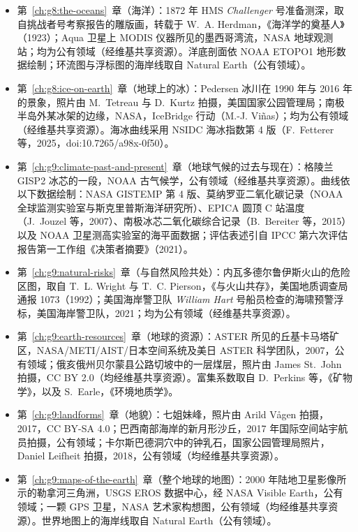 \begin{itemize}
  \item 第~\ref{ch:g8:the-oceans}~章（海洋）：1872 年 HMS \emph{Challenger} 号准备测深，取自挑战者号考察报告的雕版画，转载于 W.~A. Herdman，《海洋学的奠基人》（1923）；Aqua 卫星上 MODIS 仪器所见的墨西哥湾流，NASA 地球观测站；均为公有领域（经维基共享资源）。洋底剖面依 NOAA ETOPO1 地形数据绘制；环流图与浮标图的海岸线取自 Natural Earth（公有领域）。
  \item 第~\ref{ch:g8:ice-on-earth}~章（地球上的冰）：Pedersen 冰川在 1990 年与 2016 年的景象，照片由 M.~Tetreau 与 D.~Kurtz 拍摄，美国国家公园管理局；南极半岛外某冰架的边缘，NASA，IceBridge 行动（M.-J. Viñas）；均为公有领域（经维基共享资源）。海冰曲线采用 NSIDC 海冰指数第 4 版（F.~Fetterer 等，2025，doi:10.7265/a98x-0f50）。
  \item 第~\ref{ch:g9:climate-past-and-present}~章（地球气候的过去与现在）：格陵兰 GISP2 冰芯的一段，NOAA 古气候学，公有领域（经维基共享资源）。曲线依以下数据绘制：NASA GISTEMP 第 4 版、莫纳罗亚二氧化碳记录（NOAA 全球监测实验室与斯克里普斯海洋研究所）、EPICA 圆顶 C 站温度（J.~Jouzel 等，2007）、南极冰芯二氧化碳综合记录（B.~Bereiter 等，2015）以及 NOAA 卫星测高实验室的海平面数据；评估表述引自 IPCC 第六次评估报告第一工作组《决策者摘要》（2021）。
  \item 第~\ref{ch:g9:natural-risks}~章（与自然风险共处）：内瓦多德尔鲁伊斯火山的危险区图，取自 T.~L. Wright 与 T.~C. Pierson，《与火山共存》，美国地质调查局通报 1073（1992）；美国海岸警卫队 \emph{William Hart} 号船员检查的海啸预警浮标，美国海岸警卫队，2021；均为公有领域（经维基共享资源）。
  \item 第~\ref{ch:g9:earth-resources}~章（地球的资源）：ASTER 所见的丘基卡马塔矿区，NASA/METI/AIST/日本空间系统及美日 ASTER 科学团队，2007，公有领域；俄亥俄州贝尔蒙县公路切坡中的一层煤层，照片由 James St.~John 拍摄，CC BY 2.0（均经维基共享资源）。富集系数取自 D.~Perkins 等，《矿物学》，以及 S.~Earle，《环境地质学》。
  \item 第~\ref{ch:g9:landforms}~章（地貌）：七姐妹峰，照片由 Arild Vågen 拍摄，2017，CC BY-SA 4.0；巴西南部海岸的新月形沙丘，2017 年国际空间站宇航员拍摄，公有领域；卡尔斯巴德洞穴中的钟乳石，国家公园管理局照片，Daniel Leifheit 拍摄，2018，公有领域（均经维基共享资源）。
  \item 第~\ref{ch:g9:maps-of-the-earth}~章（整个地球的地图）：2000 年陆地卫星影像所示的勒拿河三角洲，USGS EROS 数据中心，经 NASA Visible Earth，公有领域；一颗 GPS 卫星，NASA 艺术家构想图，公有领域（均经维基共享资源）。世界地图上的海岸线取自 Natural Earth（公有领域）。
\end{itemize}
